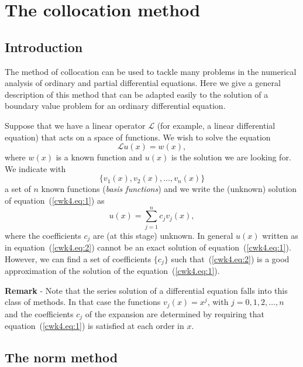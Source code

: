\section{The collocation method}

\subsection{Introduction}

The method of collocation can be used to tackle many problems in the
numerical analysis of ordinary and partial differential equations.
Here we give a general description of this method that can be adapted
easily to the solution of a boundary value problem for an ordinary
differential equation.

Suppose that we have a linear operator $\mathcal{L}$ (for example, a
linear differential equation) that acts on a space of functions.  We
wish to solve the equation
%
\begin{equation}
  \mathcal{L} u(x) = w(x) ,
  \label{cwk4.eq:1}
\end{equation}
%
where $w(x)$ is a known function and $u(x)$ is the solution we are
looking for.  We indicate with
%
\begin{equation*}
  \{v_1(x), v_2(x), \ldots, v_n(x)\}
\end{equation*}
%
a set of $n$ known functions (\textit{basis functions}) and we write
the (unknown) solution of equation~(\ref{cwk4.eq:1}) as
%
\begin{equation}
  u(x) = \sum_{j=1}^n c_j v_j(x) ,
  \label{cwk4.eq:2}
\end{equation}
%
where the coefficients $c_j$ are (at this stage) unknown.  In general
$u(x)$ written as in equation~(\ref{cwk4.eq:2}) cannot be an exact
solution of equation~(\ref{cwk4.eq:1}).  However, we can find a set of
coefficients $\{c_j\}$ such that~(\ref{cwk4.eq:2}) is a good
approximation of the solution of the equation~(\ref{cwk4.eq:1}).

\medskip

\noindent \textbf{Remark} - Note that the series solution of a
differential equation falls into this class of methods.   In that case
the functions $v_j(x)=x^j$, with $j=0,1,2,\ldots,n$ and the
coefficients $c_j$ of the expansion are determined by requiring that
equation~(\ref{cwk4.eq:1}) is satisfied at each order in $x$.

\subsection{The norm method}

